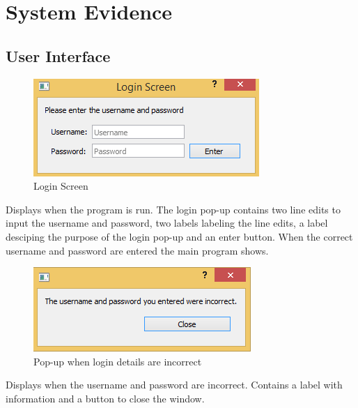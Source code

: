 \section{System Evidence}

\subsection{User Interface}

\begin{figure}[H]
\includegraphics[width=\textwidth]{./Maintenance/Images/LoginScreen.png}
    \caption{Login Screen} \label{fig:login_screen}
\end{figure}

Displays when the program is run. The login pop-up contains two line edits to input the username and password, two labels labeling the line edits, a label desciping the purpose of the login pop-up and an enter button. When the correct username and password are entered the main program shows.

\begin{figure}[H]
\includegraphics[width=\textwidth]{./Maintenance/Images/LoginScreenIncorrect.png}
    \caption{Pop-up when login details are incorrect} \label{fig:login_screen_incorrect}
\end{figure}

Displays when the username and password are incorrect. Contains a label with information and a button to close the window.

